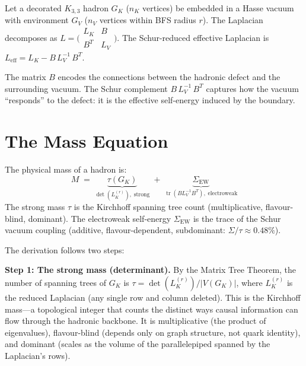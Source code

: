 \documentclass[11pt, a4paper, openany]{book}
\newcounter{thm}[chapter]
\begin{document}
\begin{definition}\label{def:schur-coupling}
Let a decorated $K_{3,3}$ hadron $G_K$ ($n_K$ vertices) be embedded
in a Hasse vacuum with environment $G_V$ ($n_V$ vertices within BFS
radius $r$). The Laplacian decomposes as
$L = \bigl(\begin{smallmatrix} L_K & B \\ B^T & L_V
\end{smallmatrix}\bigr)$.
The Schur-reduced effective Laplacian is
$L_{\mathrm{eff}} = L_K - B\, L_V^{-1}\, B^T$.
\end{definition}

\noindent
The matrix $B$ encodes the connections between the hadronic defect and
the surrounding vacuum.  The Schur complement $B\,L_V^{-1}\,B^T$
captures how the vacuum ``responds'' to the defect: it is the effective
self-energy induced by the boundary.

\section{The Mass Equation}

\begin{theorem}\label{thm:dual-mass}
The physical mass of a hadron is:
\begin{equation}
  \boxed{\;
  M \;=\; \underbrace{\tau(G_K)}_{\det(L_K^{(r)}),\;\text{strong}}
    \;+\; \underbrace{\Sigma_{\mathrm{EW}}}_{\operatorname{tr}(B L_V^{-1} B^T),
      \;\text{electroweak}}
  \;}
  \label{eq:dual-mass}
\end{equation}
The strong mass $\tau$ is the Kirchhoff spanning tree count
(multiplicative, flavour-blind, dominant). The electroweak
self-energy $\Sigma_{\mathrm{EW}}$ is the trace of the Schur vacuum
coupling (additive, flavour-dependent, subdominant:
$\Sigma/\tau \approx 0.48\%$).
\end{theorem}

\noindent
The derivation follows two steps:

\textbf{Step 1: The strong mass (determinant).}
By the Matrix Tree Theorem, the number of spanning trees of $G_K$ is
$\tau = \det(L_K^{(r)}) / |V(G_K)|$, where $L_K^{(r)}$ is the reduced
Laplacian (any single row and column deleted).  This is the Kirchhoff
mass---a topological integer that counts the distinct ways causal
information can flow through the hadronic backbone.  It is
multiplicative (the product of eigenvalues), flavour-blind (depends
only on graph structure, not quark identity), and dominant (scales as
the volume of the parallelepiped spanned by the Laplacian's rows).
\end{document}
